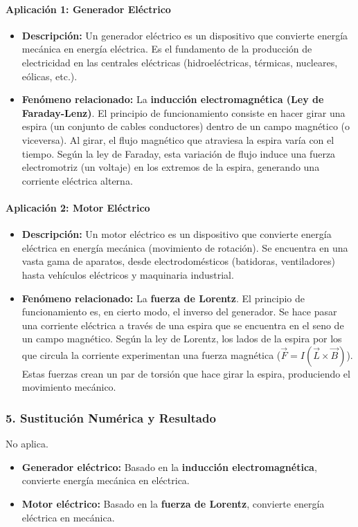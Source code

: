 \paragraph{Aplicación 1: Generador Eléctrico}
\begin{itemize}
    \item \textbf{Descripción:} Un generador eléctrico es un dispositivo que convierte energía mecánica en energía eléctrica. Es el fundamento de la producción de electricidad en las centrales eléctricas (hidroeléctricas, térmicas, nucleares, eólicas, etc.).
    \item \textbf{Fenómeno relacionado:} La \textbf{inducción electromagnética (Ley de Faraday-Lenz)}. El principio de funcionamiento consiste en hacer girar una espira (un conjunto de cables conductores) dentro de un campo magnético (o viceversa). Al girar, el flujo magnético que atraviesa la espira varía con el tiempo. Según la ley de Faraday, esta variación de flujo induce una fuerza electromotriz (un voltaje) en los extremos de la espira, generando una corriente eléctrica alterna.
\end{itemize}

\paragraph{Aplicación 2: Motor Eléctrico}
\begin{itemize}
    \item \textbf{Descripción:} Un motor eléctrico es un dispositivo que convierte energía eléctrica en energía mecánica (movimiento de rotación). Se encuentra en una vasta gama de aparatos, desde electrodomésticos (batidoras, ventiladores) hasta vehículos eléctricos y maquinaria industrial.
    \item \textbf{Fenómeno relacionado:} La \textbf{fuerza de Lorentz}. El principio de funcionamiento es, en cierto modo, el inverso del generador. Se hace pasar una corriente eléctrica a través de una espira que se encuentra en el seno de un campo magnético. Según la ley de Lorentz, los lados de la espira por los que circula la corriente experimentan una fuerza magnética ($\vec{F} = I(\vec{L} \times \vec{B})$). Estas fuerzas crean un par de torsión que hace girar la espira, produciendo el movimiento mecánico.
\end{itemize}

\subsubsection*{5. Sustitución Numérica y Resultado}
No aplica.
\begin{cajaresultado}
\begin{itemize}
    \item \textbf{Generador eléctrico:} Basado en la \textbf{inducción electromagnética}, convierte energía mecánica en eléctrica.
    \item \textbf{Motor eléctrico:} Basado en la \textbf{fuerza de Lorentz}, convierte energía eléctrica en mecánica.
\end{itemize}
\end{cajaresultado}

